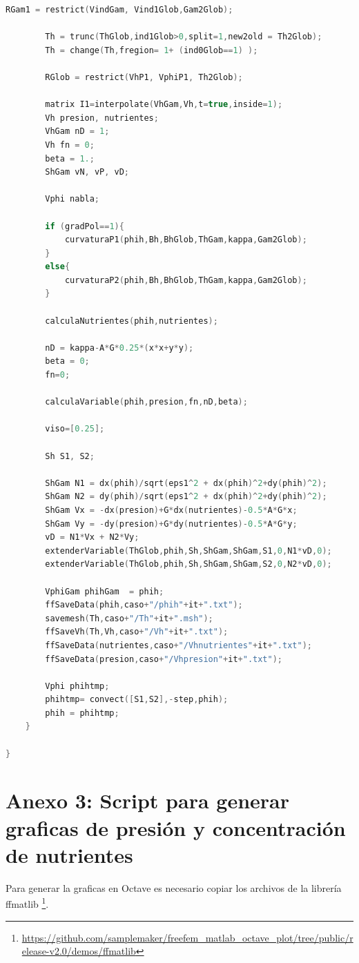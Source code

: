 \begin{lstlisting}[language=C++]
		RGam1 = restrict(VindGam, Vind1Glob,Gam2Glob);
		
		Th = trunc(ThGlob,ind1Glob>0,split=1,new2old = Th2Glob);  
		Th = change(Th,fregion= 1+ (ind0Glob==1) );
		
		RGlob = restrict(VhP1, VphiP1, Th2Glob);
		
		matrix I1=interpolate(VhGam,Vh,t=true,inside=1);
		Vh presion, nutrientes;
		VhGam nD = 1;
		Vh fn = 0;
		beta = 1.;  
		ShGam vN, vP, vD;
		
		Vphi nabla;
		
		if (gradPol==1){
			curvaturaP1(phih,Bh,BhGlob,ThGam,kappa,Gam2Glob);
		}
		else{
			curvaturaP2(phih,Bh,BhGlob,ThGam,kappa,Gam2Glob);
		}
		  
		calculaNutrientes(phih,nutrientes);  
		
		nD = kappa-A*G*0.25*(x*x+y*y);
		beta = 0; 
		fn=0;
		
		calculaVariable(phih,presion,fn,nD,beta);
		
		viso=[0.25];
		
		Sh S1, S2;
		
		ShGam N1 = dx(phih)/sqrt(eps1^2 + dx(phih)^2+dy(phih)^2);
		ShGam N2 = dy(phih)/sqrt(eps1^2 + dx(phih)^2+dy(phih)^2);
		ShGam Vx = -dx(presion)+G*dx(nutrientes)-0.5*A*G*x;
		ShGam Vy = -dy(presion)+G*dy(nutrientes)-0.5*A*G*y;
		vD = N1*Vx + N2*Vy;
		extenderVariable(ThGlob,phih,Sh,ShGam,ShGam,S1,0,N1*vD,0);
		extenderVariable(ThGlob,phih,Sh,ShGam,ShGam,S2,0,N2*vD,0);
	
		VphiGam phihGam  = phih;
		ffSaveData(phih,caso+"/phih"+it+".txt"); 
		savemesh(Th,caso+"/Th"+it+".msh");
		ffSaveVh(Th,Vh,caso+"/Vh"+it+".txt");
		ffSaveData(nutrientes,caso+"/Vhnutrientes"+it+".txt"); 
		ffSaveData(presion,caso+"/Vhpresion"+it+".txt"); 
		
		Vphi phihtmp;   
		phihtmp= convect([S1,S2],-step,phih);  
		phih = phihtmp;    
	}

}
\end{lstlisting}
\chapter*{Anexo 3: Script para generar graficas de presión y concentración de nutrientes}
\thispagestyle{fancy}
Para generar la graficas en Octave es necesario copiar los archivos de la librería\\ ffmatlib \footnote{\url{https://github.com/samplemaker/freefem_matlab_octave_plot/tree/public/release-v2.0/demos/ffmatlib}}.

